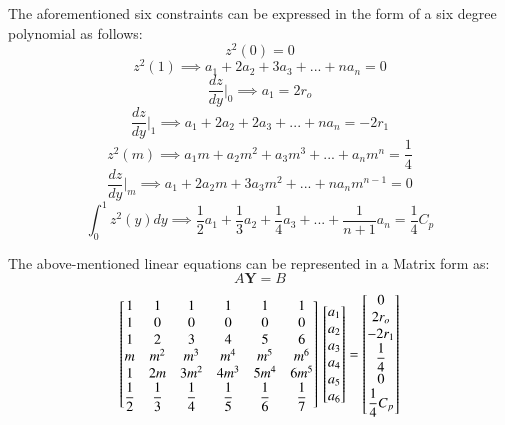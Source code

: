 The aforementioned six constraints can be expressed in the form of a six degree polynomial as follows:
\begin{equation}
z^2(0) = 0
\end{equation}
\begin{equation}
z^2(1) \implies a_1 + 2a_2 + 3a_3 +...+na_n = 0
\end{equation}
\begin{equation}
\dfrac{dz}{dy}\Big|_0 \implies a_1= 2r_o
\end{equation}
\begin{equation}
\dfrac{dz}{dy}\Big|_1 \implies a_1 + 2a_2 + 2a_3 +...+na_n = -2r_1
\end{equation}
\begin{equation}
z^2(m)\implies a_1m + a_2m^2 + a_3m^3 + ... + a_nm^n = \frac{1}{4}	
\end{equation}
\begin{equation}
\dfrac{dz}{dy}\Big|_m \implies a_1 + 2a_2m + 3a_3m^2 + ... + na_nm^{n-1} =0	
\end{equation}
\begin{equation}
\int_{0}^{1} z^2(y)dy \implies \dfrac{1}{2}a_1	+ \dfrac{1}{3}a_2 + \dfrac{1}{4}a_3+ ... + \dfrac{1}{n+1}a_n = \dfrac{1}{4}C_p
\end{equation}

The above-mentioned linear equations can be represented in a Matrix form as:
\begin{equation}
A \bm {Y} = B
\end{equation}
\[
\begin{bmatrix}
1 & 1 & 1 & 1 & 1 & 1 \\
1 & 0 & 0 & 0 & 0 & 0 \\
1 & 2 & 3 & 4 & 5 & 6 \\
m & m^2 & m^3 & m^4 & m^5 & m^6 \\
1 & 2m & 3m^2 & 4m^3 & 5m^4 & 6m^5 \\
\dfrac{1}{2} & \dfrac{1}{3} & \dfrac{1}{4} & \dfrac{1}{5} & \dfrac{1}{6} & \dfrac{1}{7} \\
\end{bmatrix}
\\
\begin{bmatrix}
a_1\\
a_2\\
a_3\\
a_4\\
a_5\\
a_6\\
\end{bmatrix}
=
\begin{bmatrix}
0\\
2r_o\\
-2r_1\\
\dfrac{1}{4}\\
0\\
\dfrac{1}{4}C_p\\
\end{bmatrix}
\]


